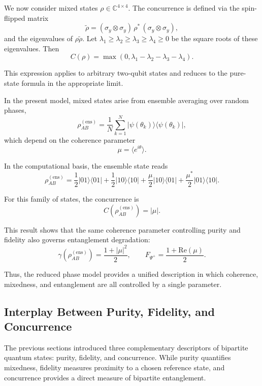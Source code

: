 \documentclass[a4paper]{article}
\begin{document}
\medskip

We now consider mixed states \( \rho \in \mathbb{C}^{4 \times 4} \). The concurrence is defined via the spin-flipped matrix
\[
\tilde{\rho}
=
(\sigma_y \otimes \sigma_y)\,\rho^*\,(\sigma_y \otimes \sigma_y),
\]
and the eigenvalues of \( \rho \tilde{\rho} \). Let \( \lambda_1 \ge \lambda_2 \ge \lambda_3 \ge \lambda_4 \ge 0 \) be the square roots of these eigenvalues. Then
\[
C(\rho)
=
\max\!\left(0,\lambda_1 - \lambda_2 - \lambda_3 - \lambda_4\right).
\]

This expression applies to arbitrary two-qubit states and reduces to the pure-state formula in the appropriate limit.

\medskip

In the present model, mixed states arise from ensemble averaging over random phases,
\[
\rho_{AB}^{(\mathrm{ens})}
=
\frac{1}{N}
\sum_{k=1}^{N}
|\psi(\theta_k)\rangle\langle\psi(\theta_k)|,
\]
which depend on the coherence parameter
\[
\mu = \langle e^{i\theta} \rangle.
\]

In the computational basis, the ensemble state reads
\[
\rho_{AB}^{(\mathrm{ens})}
=
\frac{1}{2}|01\rangle\langle 01|
+
\frac{1}{2}|10\rangle\langle 10|
+
\frac{\mu}{2}|10\rangle\langle 01|
+
\frac{\mu^*}{2}|01\rangle\langle 10|.
\]

For this family of states, the concurrence is
\[
C\!\left(\rho_{AB}^{(\mathrm{ens})}\right) = |\mu|.
\]

\medskip

This result shows that the same coherence parameter controlling purity and fidelity also governs entanglement degradation:
\[
\gamma\!\left(\rho_{AB}^{(\mathrm{ens})}\right)
=
\frac{1 + |\mu|^2}{2},
\qquad
F_{\Psi^+}
=
\frac{1 + \mathrm{Re}(\mu)}{2}.
\]

Thus, the reduced phase model provides a unified description in which coherence, mixedness, and entanglement are all controlled by a single parameter.


\subsection{Interplay Between Purity, Fidelity, and Concurrence}

The previous sections introduced three complementary descriptors of bipartite quantum states: purity, fidelity, and concurrence. While purity quantifies mixedness, fidelity measures proximity to a chosen reference state, and concurrence provides a direct measure of bipartite entanglement.
\end{document}
